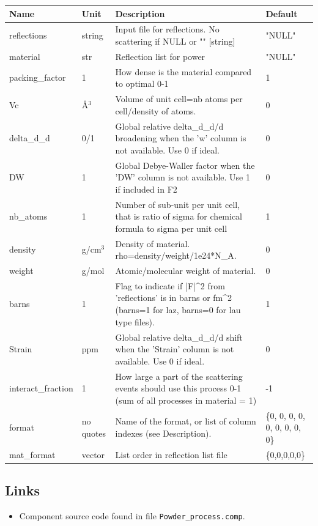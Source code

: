 \begin{longtable}{p{}p{}p{}p{}}
\toprule
\textbf{Name} & \textbf{Unit} & \textbf{Description} & \textbf{Default} \\
\midrule
\endhead
reflections & string & Input file for reflections. No scattering if NULL or "" [string] & "NULL" \\
material & str & Reflection list for power & "NULL" \\
packing\_factor & 1 & How dense is the material compared to optimal 0-1 & 1 \\
Vc & \AA{}$^{3}$ & Volume of unit cell=nb atoms per cell/density of atoms. & 0 \\
delta\_d\_d & 0/1 & Global relative delta\_d\_d/d broadening when the 'w' column is not available. Use 0 if ideal. & 0 \\
DW & 1 & Global Debye-Waller factor when the 'DW' column is not available. Use 1 if included in F2 & 0 \\
nb\_atoms & 1 & Number of sub-unit per unit cell, that is ratio of sigma for chemical formula to sigma per unit cell & 1 \\
density & g/cm$^{3}$ & Density of material. rho=density/weight/1e24*N\_A. & 0 \\
weight & g/mol & Atomic/molecular weight of material. & 0 \\
barns & 1 & Flag to indicate if |F|\textasciicircum{}2 from 'reflections' is in barns or fm\textasciicircum{}2 (barns=1 for laz, barns=0 for lau type files). & 1 \\
Strain & ppm & Global relative delta\_d\_d/d shift when the 'Strain' column is not available. Use 0 if ideal. & 0 \\
interact\_fraction & 1 & How large a part of the scattering events should use this process 0-1 (sum of all processes in material = 1) & -1 \\
format & no quotes & Name of the format, or list of column indexes (see Description). & \{0, 0, 0, 0, 0, 0, 0, 0, 0\} \\
mat\_format & vector & List order in reflection list file & \{0,0,0,0,0\} \\
\bottomrule
\end{longtable}

\subsection*{Links}
\begin{itemize}
  \item Component source code found in file \texttt{Powder\_process.comp}.
\end{itemize}
